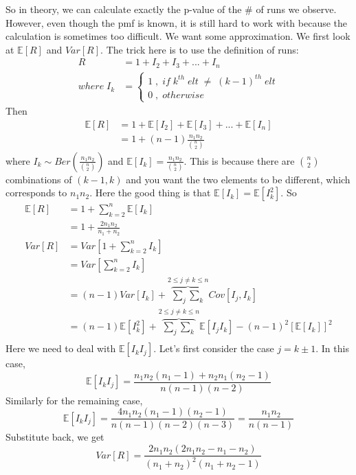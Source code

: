 \documentclass[twoside]{article}
\begin{document}
	So in theory, we can calculate exactly the p-value of the \# of runs we observe. However, even though the pmf is known, it is still hard to work with because the calculation is sometimes too difficult. We want some approximation. We first look at $\mathbb{E} [R]$ and $Var[R]$. The trick here is to use the definition of runs:
	\begin{align*}
		R &= 1 + I_2 + I_3 + ... + I_n \\
		where \; I_k &= \begin{cases} 1 \; , \; if \; k^{th} \; elt \; \neq \; (k-1)^{th} \; elt \\
			0 \; , \; otherwise
		\end{cases}
	\end{align*}
	Then
	\begin{align*}
		\mathbb{E} [R] &= 1 + \mathbb{E} [I_2] + \mathbb{E} [I_3] + ... + \mathbb{E} [I_n] \\
		&= 1 + (n-1) \frac{n_1 n_2}{\binom{n}{2}}
	\end{align*}
	where $I_k \sim Ber \left( \frac{n_1 n_2}{\binom{n}{2}} \right)$ and $\mathbb{E} [I_k] = \frac{n_1 n_2}{\binom{n}{2}}$. This is because there are $\binom{n}{2}$ combinations of $(k-1, k)$ and you want the two elements to be different, which corresponds to $n_1 n_2$. Here the good thing is that $\mathbb{E} [I_k] = \mathbb{E} [I_k^2]$. So
	\begin{align*}
		\mathbb{E} [R] &= 1 + \sum_{k=2}^n \mathbb{E} [I_k] \\
		&= 1 + \frac{2 n_1 n_2}{n_1 + n_2} \\
		Var[R] &= Var[1 + \sum_{k=2}^n I_k] \\
		&= Var [\sum_{k=2}^n I_k] \\
		&= (n-1) Var [I_k] + \overbrace{\sum_j \sum_k}^{2 \leqslant j \neq k \leqslant n} Cov [I_j, I_k] \\
		&= (n-1) \mathbb{E} [I_k^2] + \overbrace{\sum_j \sum_k}^{2 \leqslant j \neq k \leqslant n} \mathbb{E} [I_j I_k] - (n-1)^2 \left[ \mathbb{E} [I_k] \right]^2 \\
	\end{align*}
	Here we need to deal with $\mathbb{E} [I_k I_j]$. Let's first consider the case $j = k \pm 1$. In this case, 
	$$
	\mathbb{E} [I_k I_j] = \frac{n_1 n_2 (n_1 - 1) + n_2 n_1 (n_2 - 1)}{n (n-1) (n-2)}
	$$
	Similarly for the remaining case, 
	$$
	\mathbb{E} [I_k I_j] = \frac{4 n_1 n_2 (n_1 - 1) (n_2 - 1)}{n(n-1)(n-2)(n-3)} = \frac{n_1 n_2}{n (n-1)}
	$$
	Substitute back, we get
	$$
	Var [R] = \frac{2 n_1 n_2 (2 n_1 n_2 - n_1 - n_2)}{(n_1 + n_2)^2 (n_1 + n_2 - 1)}
	$$
\end{document}

